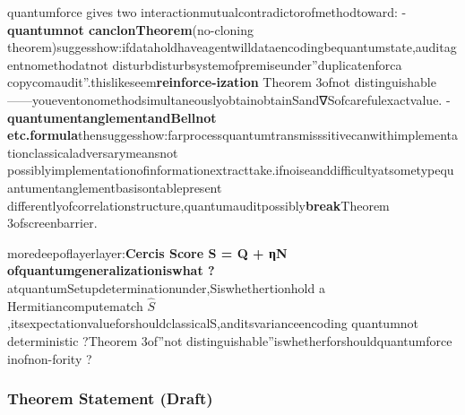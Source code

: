 \documentclass[
  12pt,
]{article}
\begin{document}
quantumforce gives two interactionmutualcontradictorofmethodtoward: -
\textbf{quantumnot canclonTheorem}(no-cloning
theorem)suggesshow:ifdataholdhaveagentwilldataencodingbequantumstate,auditagentnomethodatnot disturbdisturbsystemofpremiseunder''duplicatenforca copycomaudit''.thislikeseem\textbf{reinforce-ization} Theorem
3ofnot distinguishable ------youeventonomethodsimultaneouslyobtainobtainSand∇Sofcarefulexactvalue. -
\textbf{quantumentanglementandBellnot etc.formula}thensuggesshow:farprocessquantumtransmisssitivecanwithimplementationclassicaladversarymeansnot possiblyimplementationofinformationextracttake.ifnoiseanddifficultyatsometypequantumentanglementbasisontablepresent differentlyofcorrelationstructure,quantumauditpossibly\textbf{break}Theorem
3ofscreenbarrier.

moredeepoflayerlayer:\textbf{Cercis Score S = Q + ηN ofquantumgeneralizationiswhat ?}
atquantumSetupdeterminationunder,Siswhethertionhold a  Hermitiancomputematch
\(\hat{S}\),itsexpectationvalueforshouldclassicalS,anditsvarianceencoding quantumnot deterministic ?Theorem
3of''not distinguishable''iswhetherforshouldquantumforce inofnon-fority ?

\subsubsection{Theorem Statement (Draft)}\label{ux5b9aux7406ux9648ux8ff0ux8349ux6848}
\end{document}
